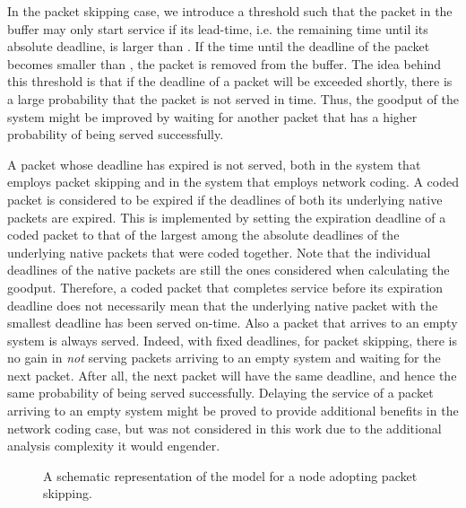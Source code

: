\documentclass[preprint,12pt]{elsarticle}
\theoremstyle{definition}
\theoremstyle{plain}
\theoremstyle{remark}
\begin{document}
In the packet skipping case, we introduce a threshold  such that the packet in the buffer may only start service if its lead-time, i.e. the remaining time until its absolute deadline, is larger than . If the time until the deadline of the packet becomes smaller than , the packet is removed from the buffer. The idea behind this threshold is that if the deadline of a packet will be exceeded shortly, there is a large probability that the packet is not served in time. Thus, the goodput of the system might be improved by waiting for another packet that has a higher probability of being served successfully.

A packet whose deadline has expired is not served, both in the system that employs packet skipping and in the system that employs network coding. A coded packet is considered to be expired if the deadlines of both its underlying native packets are expired. This is implemented by setting the expiration deadline of a coded packet to that of the largest among the absolute deadlines of the underlying native packets that were coded together. Note that the individual deadlines of the native packets are still the ones considered when calculating the goodput. Therefore, a coded packet that completes service before its expiration deadline does not necessarily mean that the underlying native packet with the smallest deadline has been served on-time. Also a packet that arrives to an empty system is always served. Indeed, with fixed deadlines, for packet skipping, there is no gain in \emph{not} serving packets arriving to an empty system and waiting for the next packet. After all, the next packet will have the same deadline, and hence the same probability of being served successfully. Delaying the service of a packet arriving to an empty system might be proved to provide additional benefits in the network coding case, but was not considered in this work due to the additional analysis complexity it would engender.

\begin{figure}[t]
\centering
{}
\caption{A schematic representation of the model for a node adopting packet skipping.}
\label{fig: model_sr}
\end{figure}
\end{document}
